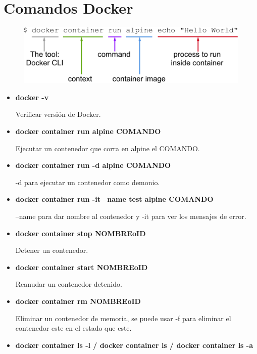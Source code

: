 \documentclass[12pt, twoside, openright]{report} %
\begin{document}
\section{Comandos Docker}
\begin{figure}[H]
	{\includegraphics[scale=.3]{a18cdc15-25f8-4985-aa8d-4748d3dc2e05.png}}
\end{figure}
\begin{itemize}
	\item \textbf{docker -v}

	      Verificar versión de Docker.

	\item \textbf{docker container run alpine COMANDO}

	      Ejecutar un contenedor que corra en alpine el COMANDO.

	\item \textbf{docker container run -d alpine COMANDO}

	      -d para ejecutar un contenedor como demonio.

	\item \textbf{docker container run -it --name test alpine COMANDO}

	      --name para dar nombre al contenedor y -it para ver los mensajes de error.

	\item \textbf{docker container stop NOMBREoID}

	      Detener un contenedor.

	\item \textbf{docker container start NOMBREoID}

	      Reanudar un contenedor detenido.

	\item \textbf{docker container rm NOMBREoID}

	      Eliminar un contenedor de memoria, se puede usar -f para eliminar el contenedor este en el estado que este.

	\item \textbf{docker container ls -l / docker container ls / docker container ls -a}


\end{itemize}
\end{document}
